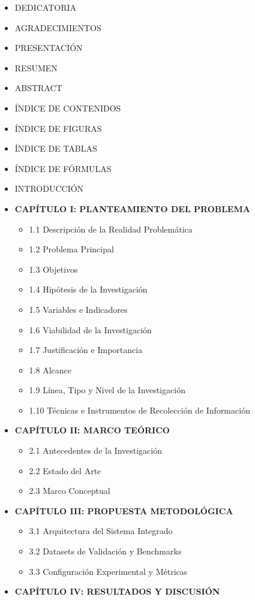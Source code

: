 \begin{itemize}
\tightlist
\item
  DEDICATORIA
\item
  AGRADECIMIENTOS
\item
  PRESENTACIÓN
\item
  RESUMEN
\item
  ABSTRACT
\item
  ÍNDICE DE CONTENIDOS
\item
  ÍNDICE DE FIGURAS
\item
  ÍNDICE DE TABLAS
\item
  ÍNDICE DE FÓRMULAS
\item
  INTRODUCCIÓN
\item
  \textbf{CAPÍTULO I: PLANTEAMIENTO DEL PROBLEMA}

  \begin{itemize}
  \tightlist
  \item
    1.1 Descripción de la Realidad Problemática
  \item
    1.2 Problema Principal
  \item
    1.3 Objetivos
  \item
    1.4 Hipótesis de la Investigación
  \item
    1.5 Variables e Indicadores
  \item
    1.6 Viabilidad de la Investigación
  \item
    1.7 Justificación e Importancia
  \item
    1.8 Alcance
  \item
    1.9 Línea, Tipo y Nivel de la Investigación
  \item
    1.10 Técnicas e Instrumentos de Recolección de Información
  \end{itemize}
\item
  \textbf{CAPÍTULO II: MARCO TEÓRICO}

  \begin{itemize}
  \tightlist
  \item
    2.1 Antecedentes de la Investigación
  \item
    2.2 Estado del Arte
  \item
    2.3 Marco Conceptual
  \end{itemize}
\item
  \textbf{CAPÍTULO III: PROPUESTA METODOLÓGICA}

  \begin{itemize}
  \tightlist
  \item
    3.1 Arquitectura del Sistema Integrado
  \item
    3.2 Datasets de Validación y Benchmarks
  \item
    3.3 Configuración Experimental y Métricas
  \end{itemize}
\item
  \textbf{CAPÍTULO IV: RESULTADOS Y DISCUSIÓN}


\end{itemize}
